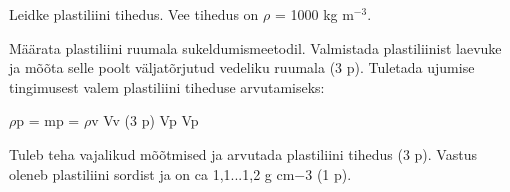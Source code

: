 
Leidke plastiliini tihedus. Vee tihedus on $\rho$ = 1000 kg m$^{-3}$.

\hint

\solu
Määrata plastiliini ruumala sukeldumismeetodil. Valmistada plastiliinist laevuke ja mõõta selle poolt väljatõrjutud vedeliku ruumala (3 p). Tuletada ujumise tingimusest valem plastiliini tiheduse arvutamiseks:

$\rho$p = mp = $\rho$v Vv (3 p) Vp Vp

Tuleb teha vajalikud mõõtmised ja arvutada plastiliini tihedus (3 p). Vastus oleneb plastiliini sordist ja on ca 1,1...1,2 g cm$-$3 (1 p).
\probend
